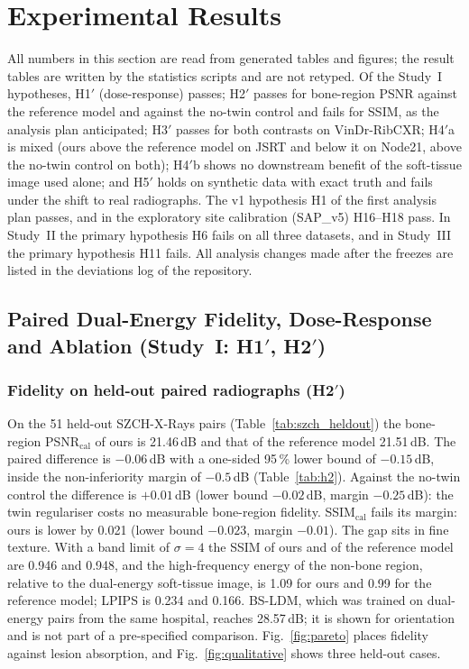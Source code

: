 \section{Experimental Results}
\label{sec:results}
All numbers in this section are read from generated tables and figures; the result tables are written by the statistics scripts and are not
retyped. Of the Study~I hypotheses, H1$'$ (dose-response) passes; H2$'$ passes for bone-region PSNR against the reference model and against
the no-twin control and fails for SSIM, as the analysis plan anticipated; H3$'$ passes for both contrasts on VinDr-RibCXR; H4$'$a is mixed
(ours above the reference model on JSRT and below it on Node21, above the no-twin control on both); H4$'$b shows no downstream benefit of
the soft-tissue image used alone; and H5$'$ holds on synthetic data with exact truth and fails under the shift to real radiographs. The v1
hypothesis H1 of the first analysis plan passes, and in the exploratory site calibration (SAP\_v5) H16--H18 pass. In Study~II the primary
hypothesis H6 fails on all three datasets, and in Study~III the primary hypothesis H11 fails. All analysis changes made after the freezes are listed in the deviations log of the repository.

\subsection{Paired Dual-Energy Fidelity, Dose-Response and Ablation (Study~I: H1\texorpdfstring{$'$}{'}, H2\texorpdfstring{$'$}{'})}
\label{sec:res-fidelity}

\subsubsection{Fidelity on held-out paired radiographs (H2$'$)}
On the 51 held-out SZCH-X-Rays pairs (Table~\ref{tab:szch_heldout}) the bone-region PSNR$_{\mathrm{cal}}$ of ours is 21.46\,dB and that of
the reference model 21.51\,dB. The paired difference is $-0.06$\,dB with a one-sided 95\,\% lower bound of $-0.15$\,dB, inside the
non-inferiority margin of $-0.5$\,dB (Table~\ref{tab:h2}). Against the no-twin control the difference is $+0.01$\,dB (lower bound
$-0.02$\,dB, margin $-0.25$\,dB): the twin regulariser costs no measurable bone-region fidelity. SSIM$_{\mathrm{cal}}$ fails its margin: ours
is lower by 0.021 (lower bound $-0.023$, margin $-0.01$). The gap sits in fine texture. With a band limit of $\sigma=4$ the SSIM of ours and
of the reference model are 0.946 and 0.948, and the high-frequency energy of the non-bone region, relative to the dual-energy soft-tissue
image, is 1.09 for ours and 0.99 for the reference model; LPIPS is 0.234 and 0.166. BS-LDM, which was trained on dual-energy pairs from the
same hospital, reaches 28.57\,dB; it is shown for orientation and is not part of a pre-specified comparison. Fig.~\ref{fig:pareto} places
fidelity against lesion absorption, and Fig.~\ref{fig:qualitative} shows three held-out cases.

